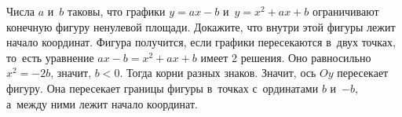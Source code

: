 \problem
Числа $a$ и~$b$ таковы, что графики $y = a x - b$ и~$y = x^2 + a x + b$
ограничивают конечную фигуру ненулевой площади.
Докажите, что внутри этой фигуры лежит начало координат.
\solution
Фигура получится, если графики пересекаются в~двух точках, то~есть уравнение
$a x - b = x^2 + ax + b$ имеет $2$ решения.
Оно равносильно $x^2 = -2b$, значит, $b < 0$.
Тогда корни разных знаков.
Значит, ось $Oy$ пересекает фигуру.
Она пересекает границы фигуры в~точках с~ординатами $b$ и~$-b$, а~между ними
лежит начало координат.
\endproblem
